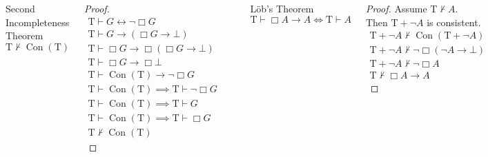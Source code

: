 \documentclass[UTF8,aspectratio=43,11pt,colorlinks,compress,openany]{beamer}%
\begin{document}
\begin{frame}\frametitle{}
\setlength\abovedisplayskip{0pt}
\setlength\belowdisplayskip{0pt}
	\begin{columns}
		\begin{block}{Second Incompleteness Theorem}
			\[\mathrm{T}\nvdash\operatorname{Con}(\mathrm{T})\]
		\end{block}
		\vspace{-1ex}
		\begin{proof}
			\begin{gather*}
			\mathrm{T}\vdash G\leftrightarrow\neg\Box G\\
			\mathrm{T}\vdash G\to(\Box G\to\bot)\\
			\mathrm{T}\vdash\Box G\to\Box (\Box G\to\bot)\\
			\mathrm{T}\vdash\Box G\to\Box \bot\\
			\mathrm{T}\vdash\operatorname{Con}(\mathrm{T})\to\neg\Box G\\
			\mathrm{T}\vdash\operatorname{Con}(\mathrm{T})\implies\mathrm{T}\vdash\neg\Box G\\
			\mathrm{T}\vdash\operatorname{Con}(\mathrm{T})\implies\mathrm{T}\vdash G\\
			\mathrm{T}\vdash\operatorname{Con}(\mathrm{T})\implies\mathrm{T}\vdash\Box G\\
			\mathrm{T}\nvdash\operatorname{Con}(\mathrm{T})
			\end{gather*}
		\end{proof}
		\begin{center}
		\end{center}
		\begin{block}{L\"ob's Theorem}
			\[\mathrm{T}\vdash\Box A\to A\iff\mathrm{T}\vdash A\]
		\end{block}
		\begin{proof}
			Assume $\mathrm{T}\nvdash A$.\\
			Then $\mathrm{T}+\neg A$ is consistent.
			\begin{gather*}
			\mathrm{T}+\neg A\nvdash\operatorname{Con}(\mathrm{T}+\neg A)\\
			\mathrm{T}+\neg A\nvdash\neg\Box (\neg A\to\bot)\\
			\mathrm{T}+\neg A\nvdash\neg\Box A\\
			\mathrm{T}\nvdash\Box A\to A
			\end{gather*}
		\end{proof}
	\end{columns}
\end{frame}
\end{document}

